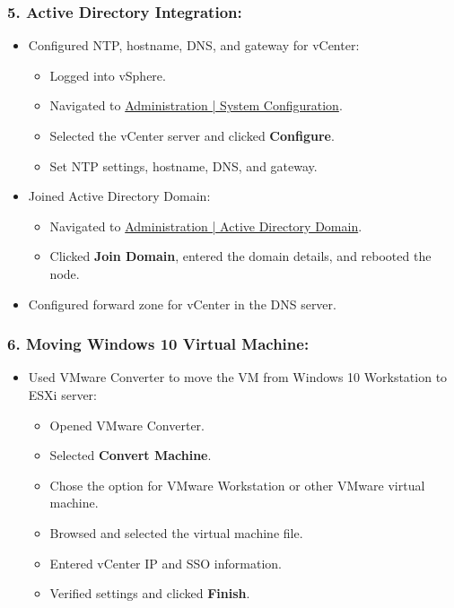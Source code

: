 \documentclass[letterpaper]{article}
\begin{document}
\subsubsection{5. Active Directory Integration:}
\label{sec:org9ebc207}
\begin{itemize}
\item Configured NTP, hostname, DNS, and gateway for vCenter:
\begin{itemize}
\item Logged into vSphere.
\item Navigated to \uline{Administration | System Configuration}.
\item Selected the vCenter server and clicked \textbf{Configure}.
\item Set NTP settings, hostname, DNS, and gateway.
\end{itemize}
\item Joined Active Directory Domain:
\begin{itemize}
\item Navigated to \uline{Administration | Active Directory Domain}.
\item Clicked \textbf{Join Domain}, entered the domain details, and rebooted the node.
\end{itemize}
\item Configured forward zone for vCenter in the DNS server.
\end{itemize}

\subsubsection{6. Moving Windows 10 Virtual Machine:}
\label{sec:org841ce2f}
\begin{itemize}
\item Used VMware Converter to move the VM from Windows 10 Workstation to ESXi server:
\begin{itemize}
\item Opened VMware Converter.
\item Selected \textbf{Convert Machine}.
\item Chose the option for VMware Workstation or other VMware virtual machine.
\item Browsed and selected the virtual machine file.
\item Entered vCenter IP and SSO information.
\item Verified settings and clicked \textbf{Finish}.
\end{itemize}
\end{itemize}
\end{document}

